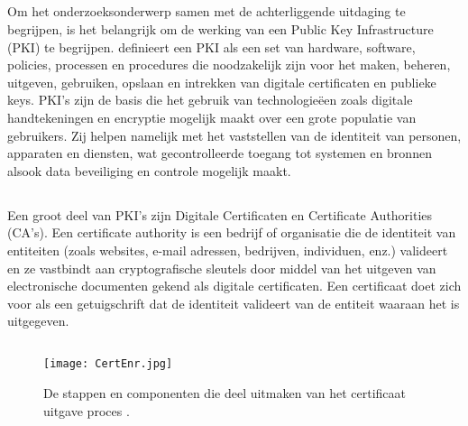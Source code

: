 \subsection{}
\label{subsec:Public_key_infrastructure}
Om het onderzoeksonderwerp samen met de achterliggende uitdaging te begrijpen, is het belangrijk om de werking van een Public Key Infrastructure (PKI) te begrijpen.
\textcite{Thales2025} definieert een PKI als een set van hardware, software, policies, processen en procedures die noodzakelijk zijn voor het maken, beheren, uitgeven, gebruiken, opslaan en intrekken van digitale certificaten en publieke keys.
PKI's zijn de basis die het gebruik van technologieëen zoals digitale handtekeningen en encryptie mogelijk maakt over een grote populatie van gebruikers.
Zij helpen namelijk met het vaststellen van de identiteit van personen, apparaten en diensten, wat gecontrolleerde toegang tot systemen en bronnen alsook data beveiliging en controle mogelijk maakt. \\

\subsection{}
\label{subsec:Certificate_authority_en_digitale_certificaten}
Een groot deel van PKI's zijn Digitale Certificaten en Certificate Authorities (CA's).
Een certificate authority is een bedrijf of organisatie die de identiteit van entiteiten (zoals websites, e-mail adressen, bedrijven, individuen, enz.) valideert en ze vastbindt aan cryptografische sleutels door middel van het uitgeven van electronische documenten gekend als digitale certificaten.
Een certificaat doet zich voor als een getuigschrift dat de identiteit valideert van de entiteit waaraan het is uitgegeven. \autocite{SSLcom} \\

\pagebreak

\subsection{}
\label{subsec:Aanvraagproces_van_certificaten}

\begin{figure}
  \centering
  \texttt{[image: CertEnr.jpg]}
  \caption[Certificate enrollment.]{\label{fig:certenr} De stappen en componenten die deel uitmaken van het certificaat uitgave proces \autocite{EncCon}.}
\end{figure}

